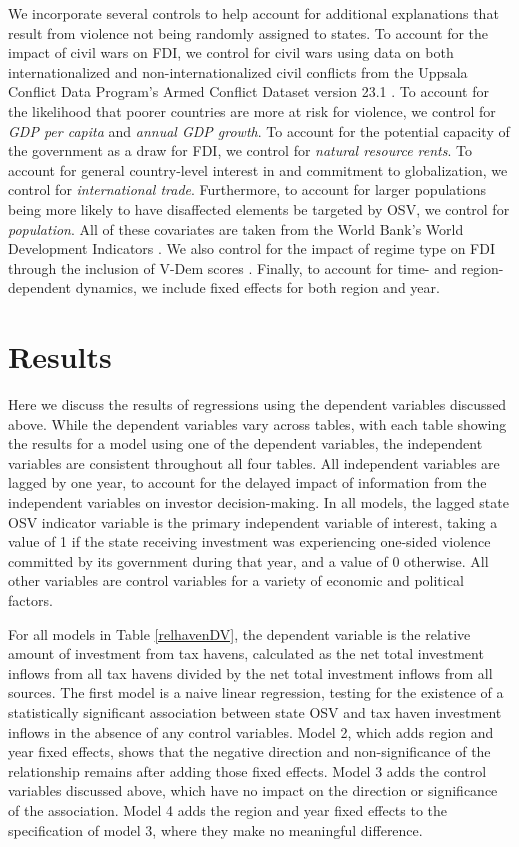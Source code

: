 \documentclass[11pt, titlepage]{article} %
\begin{document}
We incorporate several controls to help account for additional explanations that result from violence not being randomly assigned to states. To account for the impact of civil wars on FDI, we control for civil wars using data on both internationalized and non-internationalized civil conflicts from the Uppsala Conflict Data Program’s Armed Conflict Dataset version 23.1 \parencite{davies2023organized, gleditsch2002armed}. To account for the likelihood that poorer countries are more at risk for violence, we control for \textit{GDP per capita} and \textit{annual GDP growth}. To account for the potential capacity of the government as a draw for FDI, we control for \textit{natural resource rents}. To account for general country-level interest in and commitment to globalization, we control for \textit{international trade}. Furthermore, to account for larger populations being more likely to have disaffected elements be targeted by OSV, we control for \textit{population}. All of these covariates are taken from the World Bank's World Development Indicators \parencite{worldbankWorldDevelopmentIndicators2024}. We also control for the impact of regime type on FDI through the inclusion of V-Dem scores \parencite{vdem2023, pemstein2018v}. Finally, to account for time- and region-dependent dynamics, we include fixed effects for both region and year.

\section*{Results}

Here we discuss the results of regressions using the dependent variables discussed above. While the dependent variables vary across tables, with each table showing the results for a model using one of the dependent variables, the independent variables are consistent throughout all four tables. All independent variables are lagged by one year, to account for the delayed impact of information from the independent variables on investor decision-making. In all models, the lagged state OSV indicator variable is the primary independent variable of interest, taking a value of 1 if the state receiving investment was experiencing one-sided violence committed by its government during that year, and a value of 0 otherwise. All other variables are control variables for a variety of economic and political factors. 

For all models in Table \ref{relhavenDV}, the dependent variable is the relative amount of investment from tax havens, calculated as the net total investment inflows from all tax havens divided by the net total investment inflows from all sources. The first model is a naive linear regression, testing for the existence of a statistically significant association between state OSV and tax haven investment inflows in the absence of any control variables. Model 2, which adds region and year fixed effects, shows that the negative direction and non-significance of the relationship remains after adding those fixed effects. Model 3 adds the control variables discussed above, which have no impact on the direction or significance of the association. Model 4 adds the region and year fixed effects to the specification of model 3, where they make no meaningful difference. 
\end{document}
